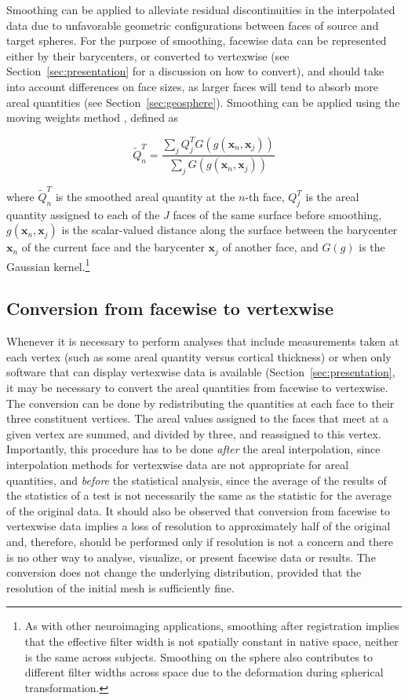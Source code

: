 Smoothing can be applied to alleviate residual discontinuities in the interpolated data due to unfavorable geometric configurations between faces of source and target spheres. For the purpose of smoothing, facewise data can be represented either by their barycenters, or converted to vertexwise (see Section~\ref{sec:presentation} for a discussion on how to convert), and should take into account differences on face sizes, as larger faces will tend to absorb more areal quantities (see Section~\ref{sec:geosphere}). Smoothing can be applied using the moving weights method \citep{Lombardi2002}, defined as

\begin{equation}
\tilde{Q}^{T}_n = \frac{\sum_j Q^{T}_j G(g(\mathbf{x}_n,\mathbf{x}_j))}{\sum_j G(g(\mathbf{x}_n,\mathbf{x}_j))}
\end{equation}

\noindent where $\tilde{Q}^{T}_n$ is the smoothed areal quantity at the $n$-th face, $Q^{T}_j$ is the areal quantity assigned to each of the $J$ faces of the same surface before smoothing, $g(\mathbf{x}_n,\mathbf{x}_j)$ is the scalar-valued distance along the surface between the barycenter $\mathbf{x}_n$ of the current face and the barycenter $\mathbf{x}_j$ of another face, and $G(g)$ is the Gaussian kernel.\footnote{As with other neuroimaging applications, smoothing after registration implies that the effective filter width is not spatially constant in native space, neither is the same across subjects. Smoothing on the sphere also contributes to different filter widths across space due to the deformation during spherical transformation.}

\subsection{Conversion from facewise to vertexwise}
\label{sec:conversion}

Whenever it is necessary to perform analyses that include measurements taken at each vertex (such as some areal quantity versus cortical thickness) or when only software that can display vertexwise data is available (Section~\ref{sec:presentation}, it may be necessary to convert the areal quantities from facewise to vertexwise. The conversion can be done by redistributing the quantities at each face to their three constituent vertices. The areal values assigned to the faces that meet at a given vertex are summed, and divided by three, and reassigned to this vertex. Importantly, this procedure has to be done \emph{after} the areal interpolation, since interpolation methods for vertexwise data are not appropriate for areal quantities, and \emph{before} the statistical analysis, since the average of the results of the statistics of a test is not necessarily the same as the statistic for the average of the original data. It should also be observed that conversion from facewise to vertexwise data implies a loss of resolution to approximately half of the original and, therefore, should be performed only if resolution is not a concern and there is no other way to analyse, visualize, or present facewise data or results. The conversion does not change the underlying distribution, provided that the resolution of the initial mesh is sufficiently fine.

